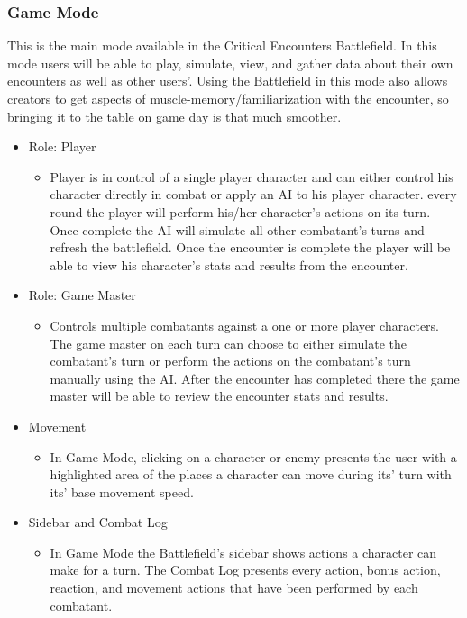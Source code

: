 \documentclass[12pt,a4paper]{report}
\begin{document}
		\subsubsection{Game Mode}
		This is the main mode available in the Critical Encounters Battlefield. In this mode users will be able to play, simulate, view, and gather data about their own encounters as well as other users'. Using the Battlefield in this mode also allows creators to get aspects of muscle-memory/familiarization with the encounter, so bringing it to the table on game day is that much smoother.
		\begin{itemize}
			\item Role: Player
			\begin{itemize}
				\item Player is in control of a single player character and can either control his character directly in combat or apply an AI to his player character. every round the player will perform his/her character's actions on its turn. Once complete the AI will simulate all other combatant's turns and refresh the battlefield. Once the encounter is complete the player will be able to view his character's stats and results from the encounter.
			\end{itemize}
			\item Role: Game Master
			\begin{itemize}
				\item Controls multiple combatants against a one or more player characters. The game master on each turn can choose to either simulate the combatant's turn or perform the actions on the combatant's turn manually using the AI. After the encounter has completed there the game master will be able to review the encounter stats and results.
			\end{itemize}
		\item Movement
			\begin{itemize}
				\item In Game Mode, clicking on a character or enemy presents the user with a highlighted area of the places a character can move during its' turn with its' base movement speed.
			\end{itemize}
		\item Sidebar and Combat Log
			\begin{itemize}
				\item In Game Mode the Battlefield's sidebar shows actions a character can make for a turn. The Combat Log presents every action, bonus action, reaction, and movement actions that have been performed by each combatant.
			\end{itemize}
		\end{itemize}
		\newpage
\end{document}
